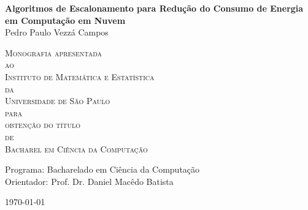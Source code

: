 \documentclass[11pt,twoside,a4paper]{book}
\begin{document}
\newcommand{\ttt}[1]{\texttt{#1}}

\frontmatter 
\fancyhead[RO]{{\footnotesize\rightmark}\hspace{2em}\thepage}
\setcounter{tocdepth}{2}
\fancyhead[LE]{\thepage\hspace{2em}\footnotesize{\leftmark}}
\fancyhead[RE,LO]{}
\fancyhead[RO]{{\footnotesize\rightmark}\hspace{2em}\thepage}

\onehalfspacing  %

\thispagestyle{empty}
\begin{center}
\vspace*{2.3cm}
\textbf{\Large{Algoritmos de Escalonamento para Redução do Consumo de
Energia em Computação em Nuvem}}\\

\vspace*{1.2cm}
\Large{Pedro Paulo Vezzá Campos}

\vskip 2cm
\textsc{
Monografia apresentada\\[-0.25cm] 
ao\\[-0.25cm]
Instituto de Matemática e Estatística\\[-0.25cm]
da\\[-0.25cm]
Universidade de São Paulo\\[-0.25cm]
para\\[-0.25cm]
obtenção do título\\[-0.25cm]
de\\[-0.25cm]
Bacharel em Ciência da Computação}

\vskip 1.5cm
Programa: Bacharelado em Ciência da Computação\\
Orientador: Prof. Dr. Daniel Macêdo Batista\\

\vskip 1cm

\vskip 0.5cm
\normalsize{\today}
\end{center}
\end{document}
